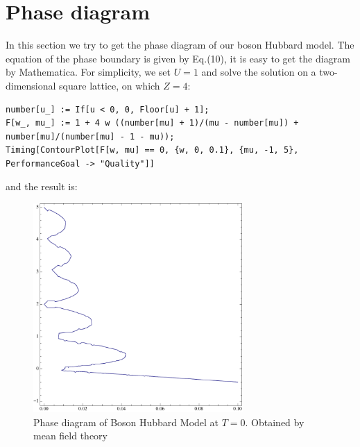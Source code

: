 \documentclass{article}
\begin{document}
\section{Phase diagram}
In this section we try to get the phase diagram of our boson Hubbard model. The equation of the phase boundary is given by Eq.(10), it is easy to get the diagram by Mathematica. For simplicity, we set $U = 1$ and solve the solution on a two-dimensional square lattice, on which $Z = 4$:
\begin{verbatim}
number[u_] := If[u < 0, 0, Floor[u] + 1];
F[w_, mu_] := 1 + 4 w ((number[mu] + 1)/(mu - number[mu]) + number[mu]/(number[mu] - 1 - mu));
Timing[ContourPlot[F[w, mu] == 0, {w, 0, 0.1}, {mu, -1, 5}, PerformanceGoal -> "Quality"]]
\end{verbatim}
and the result is:
\begin{figure}[!htp]
\centering
\includegraphics[width=8cm]{Pic1.pdf}
\caption{Phase diagram of Boson Hubbard Model at $T=0$. Obtained by mean field theory}
\end{figure}


\begin{thebibliography}{99}
\end{thebibliography}
\end{document}
